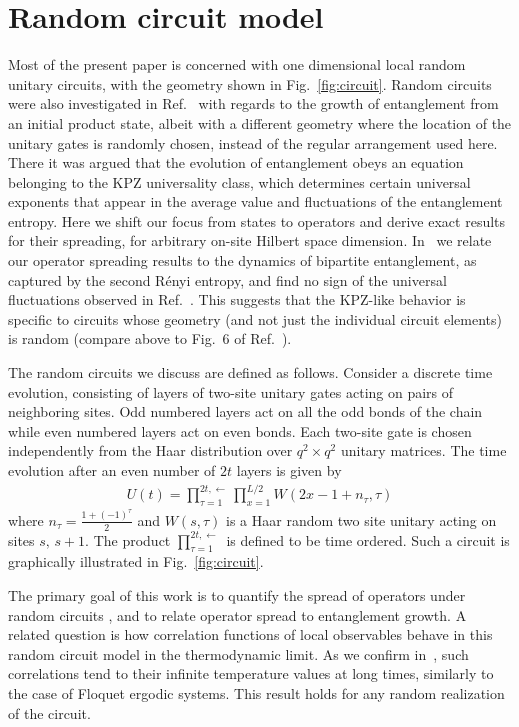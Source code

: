 \documentclass[aps,prb,twocolumn,superscriptaddress]{revtex4-1}
\begin{document}
\section{Random circuit model}\label{s:randomcircuit}
Most of the present paper is concerned with one dimensional local random unitary circuits, with the geometry shown in Fig.~\ref{fig:circuit}. Random circuits were also investigated in Ref.~ with regards to the growth of entanglement from an initial product state, albeit with a different geometry where the location of the unitary gates is randomly chosen, instead of the regular arrangement used here. There it was argued that the evolution of entanglement obeys an equation belonging to the KPZ universality class, which determines certain universal exponents that appear in the average value and fluctuations of the entanglement entropy. Here we shift our focus from states to operators and derive exact results for their spreading, for arbitrary on-site Hilbert space dimension. In~ we relate our operator spreading results to the dynamics of bipartite entanglement, as captured by the second R\'enyi entropy, and find no sign of the universal fluctuations observed in Ref.~. This suggests that the KPZ-like behavior is specific to circuits whose geometry (and not just the individual circuit elements) is random (compare  above to Fig.~6 of Ref.~).


The random circuits we discuss are defined as follows. Consider a discrete time evolution, consisting of layers of two-site unitary gates acting on pairs of neighboring sites. Odd numbered layers act on all the odd bonds of the chain while even numbered layers act on even bonds. Each two-site gate is chosen independently from the Haar distribution over $q^2\times q^2$ unitary matrices. The time evolution after an even number of $2t$ layers is given by
\begin{align}\label{eq:circuit_def}
U(t)=\prod_{\tau=1}^{2t,\leftarrow}\prod_{x=1}^{L/2}W(2 x-1+n_{\tau},\tau)
\end{align}
where $n_{\tau}=\frac{1+(-1)^{\tau}}{2}$ and $W(s,\tau)$
is a Haar random two site unitary acting on sites $s,\,s+1$. The product $\prod_{\tau=1}^{2t,\leftarrow}$ is defined to be time ordered. Such a circuit is graphically illustrated in Fig.~\ref{fig:circuit}. 

The primary goal of this work is to quantify the spread of operators under random circuits , and to relate operator spread to entanglement growth. A related question is how correlation functions of local observables behave in this random circuit model in the thermodynamic limit. As we confirm in~, such correlations tend to their infinite temperature values at long times, similarly to the case of Floquet ergodic systems\cite{Lazarides14PRL, Lazarides14PRE,Rigol14,Abanin14,Ponte15}. This result holds for any random realization of the circuit.
\end{document}
